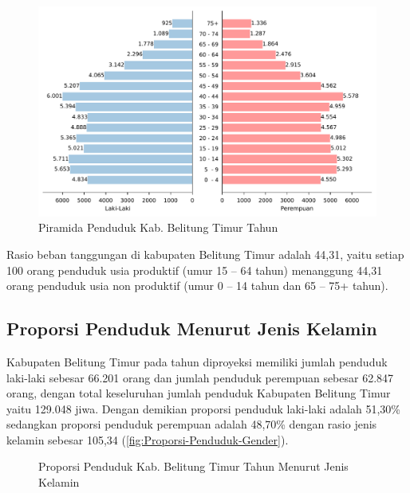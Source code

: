 \begin{figure}[!h]
    \centering{}
    \includegraphics[width=\textwidth]{bab_01/bab_01_1_piramidaPenduduk}
    \caption{Piramida Penduduk Kab. Belitung Timur Tahun \tP}
    \label{fig:Piramida-Penduduk-2022}
\end{figure}

Rasio beban tanggungan di kabupaten Belitung Timur adalah 44,31, yaitu setiap 100 orang penduduk usia produktif (umur 15 – 64 tahun) menanggung 44,31 orang penduduk usia non produktif (umur 0 – 14 tahun dan 65 – 75+ tahun).

\subsection{Proporsi Penduduk Menurut Jenis Kelamin}
Kabupaten Belitung Timur pada tahun \tP diproyeksi memiliki jumlah penduduk laki-laki sebesar 66.201 orang dan jumlah penduduk perempuan sebesar 62.847 orang, dengan total keseluruhan jumlah penduduk Kabupaten Belitung Timur yaitu 129.048 jiwa. Dengan demikian proporsi penduduk laki-laki adalah 51,30\% sedangkan proporsi penduduk perempuan adalah 48,70\% dengan rasio jenis kelamin sebesar 105,34 (\autoref{fig:Proporsi-Penduduk-Gender}).

\begin{figure}[!h]
    \centering{}
    \caption{Proporsi Penduduk Kab. Belitung Timur  Tahun \tP Menurut Jenis Kelamin}
    \label{fig:Proporsi-Penduduk-Gender}
\end{figure}

